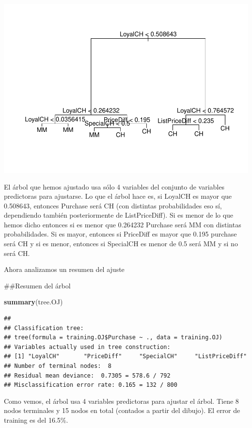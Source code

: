 \documentclass[]{article}
\newenvironment{Shaded}{\begin{snugshade}}{\end{snugshade}}
\newcommand{\KeywordTok}[1]{\textcolor[rgb]{0.13,0.29,0.53}{\textbf{{#1}}}}
\newcommand{\NormalTok}[1]{{#1}}
\begin{document}
\includegraphics{TrabajoPracticas3_files/figure-latex/unnamed-chunk-64-1.pdf}

El árbol que hemos ajustado usa sólo 4 variables del conjunto de
variables predictoras para ajustarse. Lo que el árbol hace es, si
LoyalCH es mayor que 0.508643, entonces Purchase será CH (con distintas
probabilidades eso sí, dependiendo también posteriormente de
ListPriceDiff). Si es menor de lo que hemos dicho entonces si es menor
que 0.264232 Purchase será MM con distintas probabilidades. Si es mayor,
entonces si PriceDiff es mayor que 0.195 purchase será CH y si es menor,
entonces si SpecialCH es menor de 0.5 será MM y si no será CH.

Ahora analizamos un resumen del ajuste

\begin{Shaded}
\begin{Highlighting}[]
\NormalTok{##Resumen del árbol}

\KeywordTok{summary}\NormalTok{(tree.OJ)}
\end{Highlighting}
\end{Shaded}

\begin{verbatim}
## 
## Classification tree:
## tree(formula = training.OJ$Purchase ~ ., data = training.OJ)
## Variables actually used in tree construction:
## [1] "LoyalCH"       "PriceDiff"     "SpecialCH"     "ListPriceDiff"
## Number of terminal nodes:  8 
## Residual mean deviance:  0.7305 = 578.6 / 792 
## Misclassification error rate: 0.165 = 132 / 800
\end{verbatim}

Como vemos, el árbol usa 4 variables predictoras para ajustar el árbol.
Tiene 8 nodos terminales y 15 nodos en total (contados a partir del
dibujo). El error de training es del 16.5\%.
\end{document}

